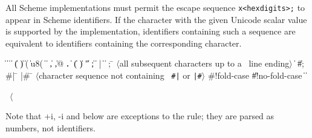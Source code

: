 All Scheme implementations must permit the escape sequence
{\tt \backwhack{}x<hexdigits>;}
to appear in Scheme identifiers. If the character
with the given Unicode scalar value is supported by the implementation,
identifiers containing such a sequence are equivalent to identifiers
containing the corresponding character. 

\begin{grammar}%
 \:  \|  \| 
\>  \|  \| 
\>  \| ( \| ) \| \sharpsign( \| \sharpsign u8( \| \singlequote{} \| \backquote{} \| , \| ,@ \| {\bf.}
 \:  \| 
\> \| ( \| ) \| " \| ;
 \: 
 \:  \| 
 \: |
 \:  \|  
\> \| 
 \: ; \= $\langle$\rm all subsequent characters up to a
		    \>\ \rm line ending$\rangle$
\> \| 
\> \| \#;  
 \: \#| \= 
\>  |\#
 \: \= $\langle$\rm character sequence not containing
\>\ \rm {\tt \#|} or {\tt |\#}$\rangle$
 \:  
 \: \#!fold-case \| \#!no-fold-case
 \:  \|  \| 
 \: %
\end{grammar}

\label{extendedalphas}
\label{identifiersyntax}

\hbox{\cf{} \goesto{} $\langle$}

Note that +i, -i and  below are exceptions to the
 rule; they are parsed as numbers, not
identifiers.

